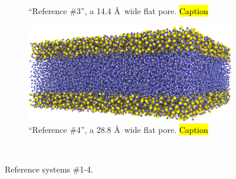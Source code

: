 \begin{figure}[htpb]
\begin{subfigure}[t]{\myfigwidth}
        \caption{%
            ``Reference \#3'', a 14.4 \AA\ wide flat pore. \hl{Caption} %
        }%
        \label{fig:renderings_flat_fracture02}%
    \end{subfigure}%
    \hfill%
    \begin{subfigure}[t]{\myfigwidth}%
        \centering%
        \includegraphics[width=\textwidth]{images/systems/trimmed-flat_fracture03_03}%
        \caption{%
            ``Reference \#4'', a 28.8 \AA\ wide flat pore. \hl{Caption} %
        }%
        \label{fig:renderings_flat_fracture03}%
    \end{subfigure}%
    \vspace{10pt}\\%
    \caption{%
        Reference systems \#1-4.
        \label{fig:renderings_flat_fractures}%
    }%
\end{figure}%
%
